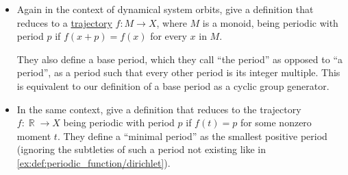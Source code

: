 \begin{remark}
\begin{itemize}
    He also discusses restrictions on the set of periods which ensure that it is an infinite cyclic group. The base period is then simply a generator of this group.

    We use the cyclicity when defining base periods, but also allow periodic functions without a base period --- see \cref{ex:def:periodic_function}.

    \item Again in the context of dynamical system orbits, \textcite[def. 11]{GiuntiMazzola2012DynamicalSystemsOnMonoids} give a definition that reduces to a \hyperref[def:dynamical_system_trajectory]{trajectory} \( f: M \to X \), where \( M \) is a monoid, being periodic with period \( p \) if \( f(x + p) = f(x) \) for every \( x \) in \( M \).

    They also define a base period, which they call \enquote{the period} as opposed to \enquote{a period}, as a period such that every other period is its integer multiple. This is equivalent to our definition of a base period as a cyclic group generator.

    \item In the same context, \textcite[2]{BrinStuck2002DynamicalSystems} give a definition that reduces to the trajectory \( f: \BbbR \to X \) being periodic with period \( p \) if \( f(t) = p \) for some nonzero moment \( t \). They define a \enquote{minimal period} as the smallest positive period (ignoring the subtleties of such a period not existing like in \cref{ex:def:periodic_function/dirichlet}).
  \end{itemize}
\end{remark}

